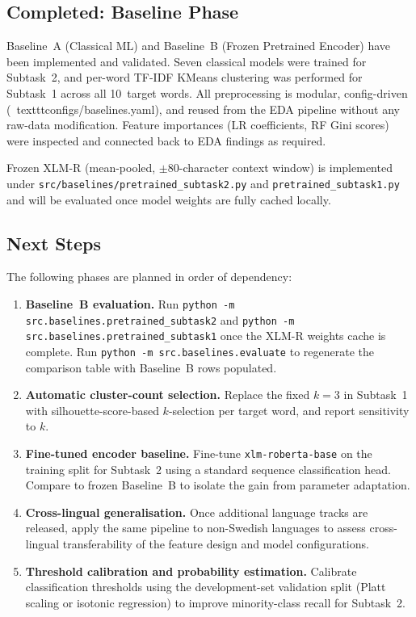 \subsection{Completed: Baseline Phase}

Baseline~A (Classical ML) and Baseline~B (Frozen Pretrained Encoder) have been implemented
and validated.  Seven classical models were trained for Subtask~2, and per-word TF-IDF
KMeans clustering was performed for Subtask~1 across all 10~target words.  All preprocessing
is modular, config-driven (\ texttt{configs/baselines.yaml}), and reused from the EDA pipeline
without any raw-data modification.  Feature importances (LR coefficients, RF Gini scores)
were inspected and connected back to EDA findings as required.

Frozen XLM-R (mean-pooled, $\pm80$-character context window) is implemented under
\texttt{src/baselines/pretrained\_subtask2.py} and \texttt{pretrained\_subtask1.py}
and will be evaluated once model weights are fully cached locally.

\subsection{Next Steps}

The following phases are planned in order of dependency:

\begin{enumerate}
  \item \textbf{Baseline~B evaluation.}
    Run \texttt{python -m src.baselines.pretrained\_subtask2} and
    \texttt{python -m src.baselines.pretrained\_subtask1} once the XLM-R weights
    cache is complete.  Run \texttt{python -m src.baselines.evaluate} to regenerate
    the comparison table with Baseline~B rows populated.

  \item \textbf{Automatic cluster-count selection.}
    Replace the fixed $k=3$ in Subtask~1 with silhouette-score-based
    $k$-selection per target word, and report sensitivity to $k$.

  \item \textbf{Fine-tuned encoder baseline.}
    Fine-tune \texttt{xlm-roberta-base} on the training split for Subtask~2
    using a standard sequence classification head.  Compare to frozen
    Baseline~B to isolate the gain from parameter adaptation.

  \item \textbf{Cross-lingual generalisation.}
    Once additional language tracks are released, apply the same pipeline
    to non-Swedish languages to assess cross-lingual transferability of
    the feature design and model configurations.

  \item \textbf{Threshold calibration and probability estimation.}
    Calibrate classification thresholds using the development-set validation
    split (Platt scaling or isotonic regression) to improve minority-class
    recall for Subtask~2.
\end{enumerate}
